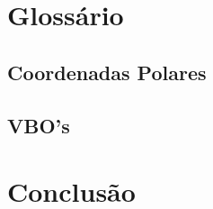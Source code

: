 \documentclass{article}
\begin{document}
\section{Glossário}

\subsection{Coordenadas Polares}

\subsection{VBO's}

\section{Conclusão}
\end{document}

